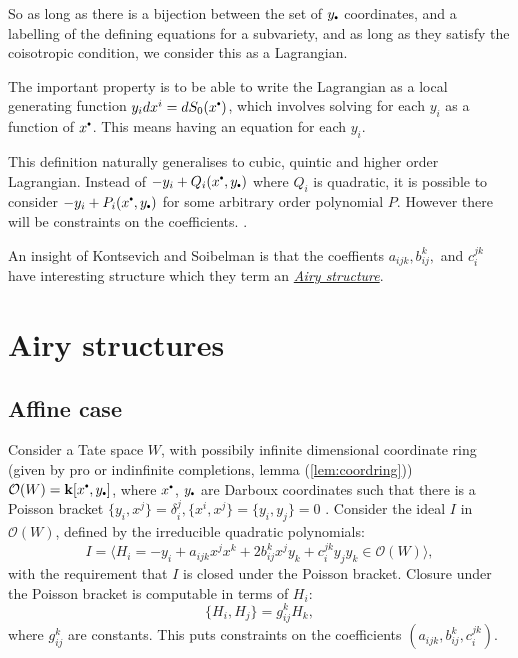     So as long as there is a bijection between the set of \(y_{\sbt}\) coordinates, and a labelling of the defining equations for a subvariety, and as long as they satisfy the coisotropic condition, we consider this as a Lagrangian.
    
    The important property is to be able to write the Lagrangian as a local generating function \( y_i dx^i = d S_0(x^{\sbt})\), which involves solving for each \(y_i\) as a function of \(x^{\sbt}\). This means having an equation for each \(y_i\).

    This definition naturally generalises to cubic, quintic and higher order Lagrangian. 
    Instead of \( -y_i + Q_i(x^{\sbt},y_{\sbt})\) where \(Q_i\) is quadratic, it is possible to consider \( -y_i + P_i(x^{\sbt},y_{\sbt})\) for some arbitrary order polynomial \(P\). However there will be  constraints on the coefficients.
    \cite{higherairy}.
    
    An insight of Kontsevich and Soibelman is that the coeffients \(a_{ijk}, b_{ij}^k, \) and \( c_{i}^{jk}\) have  interesting structure which they term an \emph{\hyperref[defn:airystruct]{ Airy structure}}. 
    

    \section{Airy structures}




    \subsection{Affine case}
    Consider a Tate space \(W\), with possibily infinite dimensional coordinate ring (given by pro or indinfinite completions, lemma (\ref{lem:coordring})) \( \mathcal{O}(W) = \mathbf{k}[x^{\sbt},y_{\sbt}]\), where \(x^{\sbt}\), \(y_{\sbt}\) are Darboux coordinates such that there is a Poisson bracket \( \{y_i , x^j \} = \delta_i^j, \{x^i,x^j\} = \{y_i,y_j\} = 0\) . Consider the ideal \(I \) in \( \mathcal{O}(W)\), defined by the irreducible quadratic polynomials: 
    \[ I = \langle H_i = -y_i + a_{ijk} x^j x^k + 2 b_{ij}^k x^j y_k + c_i^{jk} y_j y_k \in  \mathcal{O}(W)\rangle, \] 
    with the requirement that \(I\) is closed under the Poisson bracket. Closure under the Poisson bracket is computable in terms of \(H_i\):
    \[ \{ H_i, H_j \} = g_{ij}^k H_k, \]
    where \( g_{ij}^k \) are constants. This puts constraints on the coefficients \( (a_{ijk},b_{ij}^k, c_{i}^{jk})\). 

